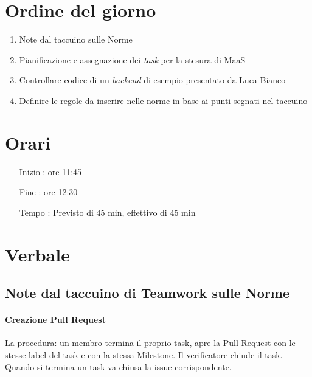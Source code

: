\documentclass[11pt]{meetingmins}
\begin{document}
\maketitle

\section{Ordine del giorno}

\begin{enumerate}

\item Note dal taccuino sulle Norme
\item Pianificazione e assegnazione dei \textit{task} per la stesura di MaaS
\item Controllare codice di un \textit{backend} di esempio presentato da Luca Bianco
\item Definire le regole da inserire nelle norme in base ai punti segnati nel taccuino


\end{enumerate}

\section{Orari}

\begin{itemize}
\item[Inizio]: ore 11:45
\item[Fine]: ore 12:30
\item[Tempo]: Previsto di 45 min, effettivo di 45 min

\end{itemize}

\section{Verbale}

\subsection{Note dal taccuino di Teamwork sulle Norme}
	\paragraph*{Creazione Pull Request}
		La procedura: un membro termina il proprio task, apre la Pull Request con le stesse 
		label del task e con la stessa Milestone. Il verificatore chiude il task.
		Quando si termina un task va chiusa la issue corrispondente.
\end{document}
